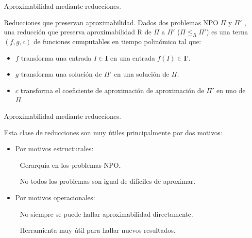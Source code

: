 \documentclass{beamer}
\begin{document}
\begin{frame}{Aproximabilidad mediante reducciones.}

\begin{block}{Reducciones que preservan aproximabilidad.}
Dados dos problemas NPO $\Pi$ y $\Pi'$ , una reducci\'on que preserva aproximabilidad R  de $\Pi$ a $\Pi'$ ($\Pi \leq_{R} \Pi'$) es una terna $(f, g, c)$ de funciones cumputables en tiempo polin\'omico tal que:

\begin{itemize}

\item $f$ transforma una entrada $I\in\textbf{I}$ en una entrada $f(I)\in\textbf{I'}$.
\item $g$ transforma una soluci\'on de $\Pi'$ en una soluci\'on de $\Pi$.
\item $c$ transforma el coeficiente de aproximaci\'on de aproximaci\'on de $\Pi'$ en uno de $\Pi$.

\end{itemize}
\end{block}
    
\end{frame}


\begin{frame}{Aproximabilidad mediante reducciones.}

Esta clase de reducciones son muy \'utiles principalmente por dos motivos:


\begin{itemize}
    \item Por motivos estructurales:
    
    - Gerarqu\'ia en los problemas NPO.
    
    - No todos los problemas son igual de dif\'iciles de aproximar.
\end{itemize}
\begin{itemize}
    \item Por motivos operacionales:
    
    - No siempre se puede hallar aproximabilidad directamente.
    
    - Herramienta muy \'util para hallar nuevos resultados.
\end{itemize}

\end{frame}
\end{document}
